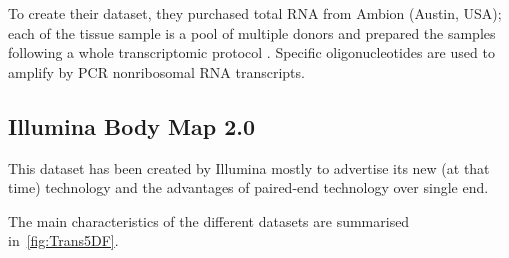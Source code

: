 To create their dataset, they purchased total \gls{RNA}
from Ambion (Austin, USA); each of the tissue sample is a pool of multiple donors
and prepared the samples following a whole transcriptomic protocol \citep{Armour:2009}.
Specific oligonucleotides are used to amplify by \gls{PCR} nonribosomal \gls{RNA}
transcripts.


\subsection{Illumina Body Map 2.0}

This dataset has been created by Illumina mostly to advertise its new (at that time)
technology and the advantages of paired-end technology over single end.
\citep{illuminaBM}


The main characteristics of the different datasets are summarised
in~\cref{fig:Trans5DF}.

